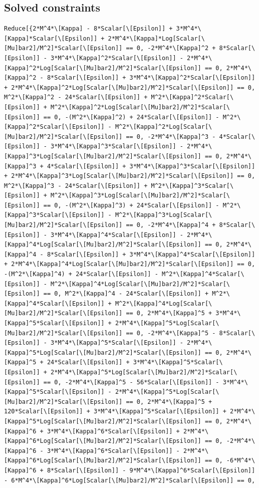 \documentclass[11pt]{article}
\begin{document}
\subsection{Solved constraints}
\begin{verbatim}
Reduce[{2*M^4*\[Kappa] - 8*Scalar[\[Epsilon]] + 3*M^4*\[Kappa]*Scalar[\[Epsilon]] + 2*M^4*\[Kappa]*Log[Scalar[\[Mu]bar2]/M^2]*Scalar[\[Epsilon]] == 0, -2*M^4*\[Kappa]^2 + 8*Scalar[\[Epsilon]] - 3*M^4*\[Kappa]^2*Scalar[\[Epsilon]] - 2*M^4*\[Kappa]^2*Log[Scalar[\[Mu]bar2]/M^2]*Scalar[\[Epsilon]] == 0, 2*M^4*\[Kappa]^2 - 8*Scalar[\[Epsilon]] + 3*M^4*\[Kappa]^2*Scalar[\[Epsilon]] + 2*M^4*\[Kappa]^2*Log[Scalar[\[Mu]bar2]/M^2]*Scalar[\[Epsilon]] == 0, M^2*\[Kappa]^2 - 24*Scalar[\[Epsilon]] + M^2*\[Kappa]^2*Scalar[\[Epsilon]] + M^2*\[Kappa]^2*Log[Scalar[\[Mu]bar2]/M^2]*Scalar[\[Epsilon]] == 0, -(M^2*\[Kappa]^2) + 24*Scalar[\[Epsilon]] - M^2*\[Kappa]^2*Scalar[\[Epsilon]] - M^2*\[Kappa]^2*Log[Scalar[\[Mu]bar2]/M^2]*Scalar[\[Epsilon]] == 0, -2*M^4*\[Kappa]^3 - 4*Scalar[\[Epsilon]] - 3*M^4*\[Kappa]^3*Scalar[\[Epsilon]] - 2*M^4*\[Kappa]^3*Log[Scalar[\[Mu]bar2]/M^2]*Scalar[\[Epsilon]] == 0, 2*M^4*\[Kappa]^3 + 4*Scalar[\[Epsilon]] + 3*M^4*\[Kappa]^3*Scalar[\[Epsilon]] + 2*M^4*\[Kappa]^3*Log[Scalar[\[Mu]bar2]/M^2]*Scalar[\[Epsilon]] == 0, M^2*\[Kappa]^3 - 24*Scalar[\[Epsilon]] + M^2*\[Kappa]^3*Scalar[\[Epsilon]] + M^2*\[Kappa]^3*Log[Scalar[\[Mu]bar2]/M^2]*Scalar[\[Epsilon]] == 0, -(M^2*\[Kappa]^3) + 24*Scalar[\[Epsilon]] - M^2*\[Kappa]^3*Scalar[\[Epsilon]] - M^2*\[Kappa]^3*Log[Scalar[\[Mu]bar2]/M^2]*Scalar[\[Epsilon]] == 0, -2*M^4*\[Kappa]^4 + 8*Scalar[\[Epsilon]] - 3*M^4*\[Kappa]^4*Scalar[\[Epsilon]] - 2*M^4*\[Kappa]^4*Log[Scalar[\[Mu]bar2]/M^2]*Scalar[\[Epsilon]] == 0, 2*M^4*\[Kappa]^4 - 8*Scalar[\[Epsilon]] + 3*M^4*\[Kappa]^4*Scalar[\[Epsilon]] + 2*M^4*\[Kappa]^4*Log[Scalar[\[Mu]bar2]/M^2]*Scalar[\[Epsilon]] == 0, -(M^2*\[Kappa]^4) + 24*Scalar[\[Epsilon]] - M^2*\[Kappa]^4*Scalar[\[Epsilon]] - M^2*\[Kappa]^4*Log[Scalar[\[Mu]bar2]/M^2]*Scalar[\[Epsilon]] == 0, M^2*\[Kappa]^4 - 24*Scalar[\[Epsilon]] + M^2*\[Kappa]^4*Scalar[\[Epsilon]] + M^2*\[Kappa]^4*Log[Scalar[\[Mu]bar2]/M^2]*Scalar[\[Epsilon]] == 0, 2*M^4*\[Kappa]^5 + 3*M^4*\[Kappa]^5*Scalar[\[Epsilon]] + 2*M^4*\[Kappa]^5*Log[Scalar[\[Mu]bar2]/M^2]*Scalar[\[Epsilon]] == 0, -2*M^4*\[Kappa]^5 - 8*Scalar[\[Epsilon]] - 3*M^4*\[Kappa]^5*Scalar[\[Epsilon]] - 2*M^4*\[Kappa]^5*Log[Scalar[\[Mu]bar2]/M^2]*Scalar[\[Epsilon]] == 0, 2*M^4*\[Kappa]^5 + 24*Scalar[\[Epsilon]] + 3*M^4*\[Kappa]^5*Scalar[\[Epsilon]] + 2*M^4*\[Kappa]^5*Log[Scalar[\[Mu]bar2]/M^2]*Scalar[\[Epsilon]] == 0, -2*M^4*\[Kappa]^5 - 56*Scalar[\[Epsilon]] - 3*M^4*\[Kappa]^5*Scalar[\[Epsilon]] - 2*M^4*\[Kappa]^5*Log[Scalar[\[Mu]bar2]/M^2]*Scalar[\[Epsilon]] == 0, 2*M^4*\[Kappa]^5 + 120*Scalar[\[Epsilon]] + 3*M^4*\[Kappa]^5*Scalar[\[Epsilon]] + 2*M^4*\[Kappa]^5*Log[Scalar[\[Mu]bar2]/M^2]*Scalar[\[Epsilon]] == 0, 2*M^4*\[Kappa]^6 + 3*M^4*\[Kappa]^6*Scalar[\[Epsilon]] + 2*M^4*\[Kappa]^6*Log[Scalar[\[Mu]bar2]/M^2]*Scalar[\[Epsilon]] == 0, -2*M^4*\[Kappa]^6 - 3*M^4*\[Kappa]^6*Scalar[\[Epsilon]] - 2*M^4*\[Kappa]^6*Log[Scalar[\[Mu]bar2]/M^2]*Scalar[\[Epsilon]] == 0, -6*M^4*\[Kappa]^6 + 8*Scalar[\[Epsilon]] - 9*M^4*\[Kappa]^6*Scalar[\[Epsilon]] - 6*M^4*\[Kappa]^6*Log[Scalar[\[Mu]bar2]/M^2]*Scalar[\[Epsilon]] == 0, 
\end{verbatim}
\end{document}
